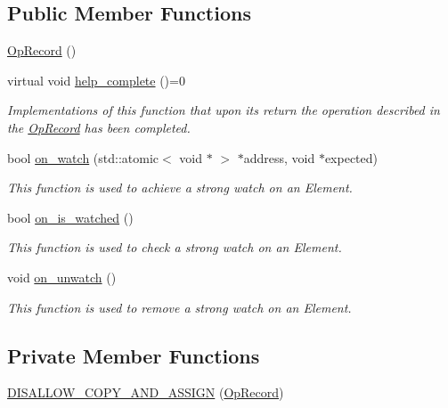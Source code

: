 \subsection*{Public Member Functions}
\begin{DoxyCompactItemize}
\item 
\hyperlink{classtervel_1_1util_1_1_op_record_aab6cd47463ff94ff4e94a7f1a57b7312}{Op\+Record} ()
\item 
virtual void \hyperlink{classtervel_1_1util_1_1_op_record_aa75ab39688a8d4cceb6a1ef0409537c0}{help\+\_\+complete} ()=0
\begin{DoxyCompactList}\small\item\em Implementations of this function that upon its return the operation described in the \hyperlink{classtervel_1_1util_1_1_op_record}{Op\+Record} has been completed. \end{DoxyCompactList}\item 
bool \hyperlink{classtervel_1_1util_1_1_op_record_a6433f4d6d353ba6ed66e8eaefaa07d32}{on\+\_\+watch} (std\+::atomic$<$ void $\ast$ $>$ $\ast$address, void $\ast$expected)
\begin{DoxyCompactList}\small\item\em This function is used to achieve a strong watch on an Element. \end{DoxyCompactList}\item 
bool \hyperlink{classtervel_1_1util_1_1_op_record_a80c4ee47bebf246ce40bb922958dd21b}{on\+\_\+is\+\_\+watched} ()
\begin{DoxyCompactList}\small\item\em This function is used to check a strong watch on an Element. \end{DoxyCompactList}\item 
void \hyperlink{classtervel_1_1util_1_1_op_record_a0018d1a71b9b3dcc4e2f59f34c938a46}{on\+\_\+unwatch} ()
\begin{DoxyCompactList}\small\item\em This function is used to remove a strong watch on an Element. \end{DoxyCompactList}\end{DoxyCompactItemize}
\subsection*{Private Member Functions}
\begin{DoxyCompactItemize}
\item 
\hyperlink{classtervel_1_1util_1_1_op_record_abf951d0ffac66bfebc8ae6aef8a3c6e1}{D\+I\+S\+A\+L\+L\+O\+W\+\_\+\+C\+O\+P\+Y\+\_\+\+A\+N\+D\+\_\+\+A\+S\+S\+I\+G\+N} (\hyperlink{classtervel_1_1util_1_1_op_record}{Op\+Record})
\end{DoxyCompactItemize}


